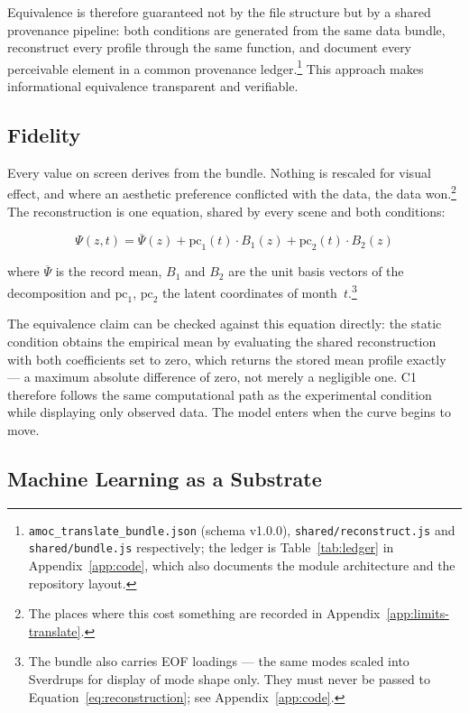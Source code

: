 Equivalence is therefore guaranteed not by the file structure but by a shared provenance pipeline: both conditions are generated from the same data bundle, reconstruct every profile through the same function, and document every perceivable element in a common provenance ledger.\footnote{\texttt{amoc\_translate\_bundle.json} (schema v1.0.0), \texttt{shared/reconstruct.js} and \texttt{shared/bundle.js} respectively; the ledger is Table~\ref{tab:ledger} in Appendix~\ref{app:code}, which also documents the module architecture and the repository layout.} This approach makes informational equivalence transparent and verifiable.

\subsection{Fidelity}
\label{subsec:fidelity}

Every value on screen derives from the bundle. Nothing is rescaled for visual effect, and where an aesthetic preference conflicted with the data, the data won.\footnote{The places where this cost something are recorded in Appendix~\ref{app:limits-translate}.} The reconstruction is one equation, shared by every scene and both conditions:

\begin{equation}
\label{eq:reconstruction}
\Psi(z, t) = \overline{\Psi}(z) + \mathrm{pc}_1(t) \cdot B_1(z) + \mathrm{pc}_2(t) \cdot B_2(z)
\end{equation}

where $\overline{\Psi}$ is the record mean, $B_1$ and $B_2$ are the unit basis vectors of the decomposition and $\mathrm{pc}_1$, $\mathrm{pc}_2$ the latent coordinates of month~$t$.\footnote{The bundle also carries EOF loadings --- the same modes scaled into Sverdrups for display of mode shape only. They must never be passed to Equation~\ref{eq:reconstruction}; see Appendix~\ref{app:code}.}

The equivalence claim can be checked against this equation directly: the static condition obtains the empirical mean by evaluating the shared reconstruction with both coefficients set to zero, which returns the stored mean profile exactly --- a maximum absolute difference of zero, not merely a negligible one. C1 therefore follows the same computational path as the experimental condition while displaying only observed data. The model enters when the curve begins to move.

\subsection{Machine Learning as a Substrate}
\label{subsec:ml-role}

